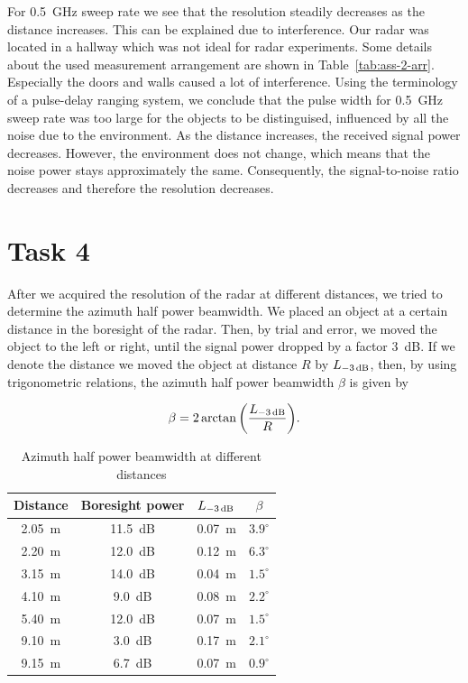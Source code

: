 \documentclass[11pt,titlepage]{report}
\begin{document}
For \SI{0.5}{GHz} sweep rate we see that the resolution steadily decreases as the distance increases. This can be explained due to interference. Our radar was located in a hallway which was not ideal for radar experiments. Some details about the used measurement arrangement are shown in Table~\ref{tab:ass-2-arr}. Especially the doors and walls caused a lot of interference. Using the terminology of a pulse-delay ranging system, we conclude that the pulse width for \SI{0.5}{GHz} sweep rate was too large for the objects to be distinguised, influenced by all the noise due to the environment. As the distance increases, the received signal power decreases. However, the environment does not change, which means that the noise power stays approximately the same. Consequently, the signal-to-noise ratio decreases and therefore the resolution decreases.

\section{Task 4}
After we acquired the resolution of the radar at different distances, we tried to determine the azimuth half power beamwidth. We placed an object at a certain distance in the boresight of the radar. Then, by trial and error, we moved the object to the left or right, until the signal power dropped by a factor \SI{3}{dB}. If we denote the distance we moved the object at distance $R$ by $L_{\text{\SI{-3}{dB}}}$, then, by using trigonometric relations, the azimuth half power beamwidth $\beta$ is given by

\begin{equation}
	\beta = 2 \arctan{\left(\frac{L_{\text{\SI{-3}{dB}}}}{R}\right)}.
\end{equation}

\newcommand{\ignore}[1]{}

\begin{table}[H]
	\centering
	\caption{Azimuth half power beamwidth at different distances}
	\label{tab:ass-2-az}
	\begin{tabular}{c c c c}
		\hline\hline
		Distance & Boresight power & $L_{\text{\SI{-3}{dB}}}$ & $\beta$ \\
		\hline
		\SI{2.05}{m} & \SI{11.5}{dB} & \SI{0.07}{m} & $3.9^\circ$ \\
		\SI{2.20}{m} & \SI{12.0}{dB} & \SI{0.12}{m} & $6.3^\circ$ \\
		\SI{3.15}{m} & \SI{14.0}{dB} & \SI{0.04}{m} & $1.5^\circ$ \\
		\SI{4.10}{m} & \SI{9.0}{dB} & \SI{0.08}{m} & $2.2^\circ$ \\
		\SI{5.40}{m} & \SI{12.0}{dB} & \SI{0.07}{m} & $1.5^\circ$ \\
		\SI{9.10}{m} & \SI{3.0}{dB} & \SI{0.17}{m} & $2.1^\circ$ \\
		\SI{9.15}{m} & \SI{6.7}{dB} & \SI{0.07}{m} & $0.9^\circ$ \\
		\hline
	\end{tabular}
\end{table}
\end{document}
